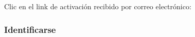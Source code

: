 \documentclass[12pt, spanish]{article}
\begin{document}
\begin{steps}
        \item Clic en el link de activación recibido por correo electrónico:

            \medskip
            \begin{minipage}[t]{\linewidth}
            \raggedright
        \end{minipage}

    \end{steps}


    \subsubsection{Identificarse}

    \label{sec:login}
\end{document}
